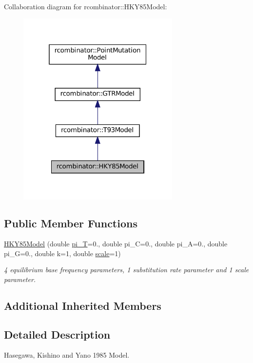 Collaboration diagram for rcombinator\+:\+:H\+K\+Y85\+Model\+:\nopagebreak
\begin{figure}[H]
\begin{center}
\leavevmode
\includegraphics[width=229pt]{classrcombinator_1_1HKY85Model__coll__graph}
\end{center}
\end{figure}
\subsection*{Public Member Functions}
\begin{DoxyCompactItemize}
\item 
\mbox{\hyperlink{classrcombinator_1_1HKY85Model_a2f4a296cdc444c92b54a4d972b044cdb}{H\+K\+Y85\+Model}} (double \mbox{\hyperlink{classrcombinator_1_1GTRModel_a1f58fe556a5ce9aaba6168c9f91e8372}{pi\+\_\+T}}=0., double pi\+\_\+C=0., double pi\+\_\+A=0., double pi\+\_\+G=0., double k=1, double \mbox{\hyperlink{classrcombinator_1_1PointMutationModel_a328a30a438bb1b6a625faa3f714a85c8}{scale}}=1)
\begin{DoxyCompactList}\small\item\em 4 equilibrium base frequency parameters, 1 substitution rate parameter and 1 scale parameter. \end{DoxyCompactList}\end{DoxyCompactItemize}
\subsection*{Additional Inherited Members}


\subsection{Detailed Description}
Hasegawa, Kishino and Yano 1985 Model. 

